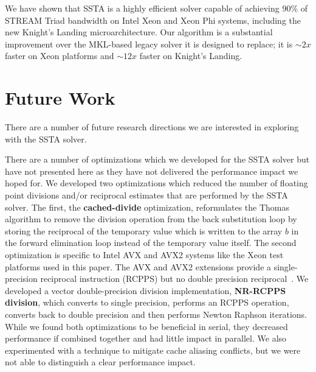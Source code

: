 \documentclass{sig-alternate-05-2015}
\begin{document}
We have shown that SSTA is a highly efficient solver capable of achieving 90\%
  of STREAM Triad bandwidth on Intel Xeon and Xeon Phi systems, including the new
  Knight's Landing microarchitecture.
Our algorithm is a substantial improvement over the MKL-based legacy solver it
  is designed to replace; it is \(\sim 2x\) faster on Xeon platforms and
  \(\sim 12x\) faster on Knight's Landing.

\section{Future Work}
\label{sec:future_work}

There are a number of future research directions we are interested in exploring
  with the SSTA solver.

There are a number of optimizations which we developed for the SSTA
  solver but have not presented here as they have not delivered the performance
  impact we hoped for.
We developed two optimizations which reduced the number of floating point
  divisions and/or reciprocal estimates that are performed by the SSTA solver. 
The first, the \textbf{cached-divide} optimization, reformulates the Thomas 
  algorithm to remove the division operation from the back substitution loop by
  storing the reciprocal of the temporary value which is written to the array
  \(b\) in the forward elimination loop instead of the temporary value itself.
The second optimization is specific to Intel AVX and AVX2 systems like the Xeon
  test platforms used in this paper.
The AVX and AVX2 extensions provide a single-precision reciprocal instruction
  (RCPPS) but no double precision reciprocal~\cite{intel_opt_manual}.
We developed a vector double-precision division implementation,
  \textbf{NR-RCPPS division}, which converts to single precision, performs an
  RCPPS operation, converts back to double precision and then performs Newton
  Raphson iterations.
While we found both optimizations to be beneficial in serial, they decreased
  performance if combined together and had little impact in parallel.
We also experimented with a technique to mitigate cache aliasing
  conflicts, but we were not able to distinguish a clear performance impact.
\end{document}
